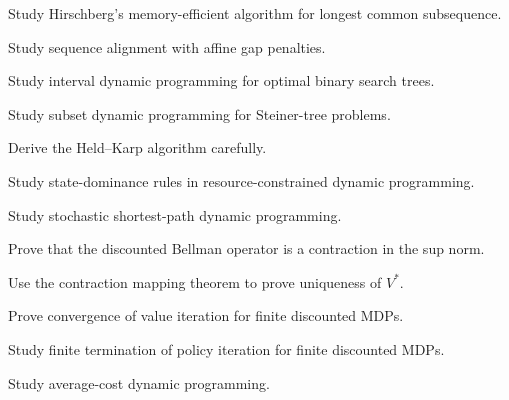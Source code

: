 \begin{exercise}[4]
Study Hirschberg's memory-efficient algorithm for longest common
subsequence.
\end{exercise}

\begin{exercise}[4]
Study sequence alignment with affine gap penalties.
\end{exercise}

\begin{exercise}[4]
Study interval dynamic programming for optimal binary search trees.
\end{exercise}

\begin{exercise}[4]
Study subset dynamic programming for Steiner-tree problems.
\end{exercise}

\begin{exercise}[4]
Derive the Held--Karp algorithm carefully.
\end{exercise}

\begin{exercise}[4]
Study state-dominance rules in resource-constrained dynamic programming.
\end{exercise}

\begin{exercise}[4]
Study stochastic shortest-path dynamic programming.
\end{exercise}

\begin{exercise}[4]
Prove that the discounted Bellman operator is a contraction in the sup
norm.
\end{exercise}

\begin{exercise}[4]
Use the contraction mapping theorem to prove uniqueness of \(V^*\).
\end{exercise}

\begin{exercise}[4]
Prove convergence of value iteration for finite discounted MDPs.
\end{exercise}

\begin{exercise}[4]
Study finite termination of policy iteration for finite discounted MDPs.
\end{exercise}

\begin{exercise}[4]
Study average-cost dynamic programming.
\end{exercise}

